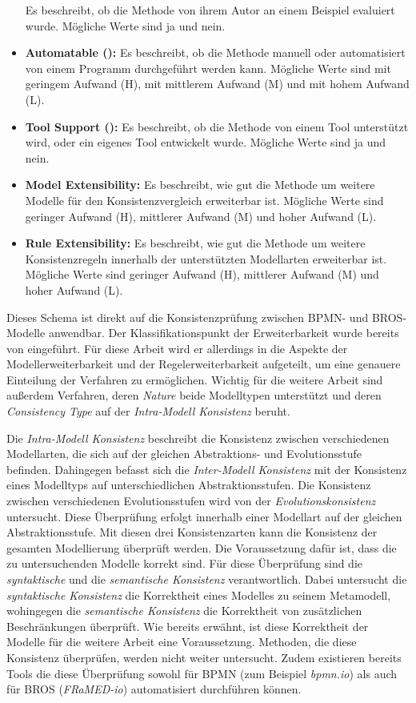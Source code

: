 \begin{itemize}
    Es beschreibt, ob die Methode von ihrem Autor an einem Beispiel evaluiert wurde.
    Mögliche Werte sind ja und nein. 
    \item \textbf{Automatable (\cite{Usman2008}):}
    Es beschreibt, ob die Methode manuell oder automatisiert von einem Programm durchgeführt werden kann.
    Mögliche Werte sind mit geringem Aufwand (H), mit mittlerem Aufwand (M) und mit hohem Aufwand (L).
    \item \textbf{Tool Support (\cite{Usman2008}):}
    Es beschreibt, ob die Methode von einem Tool unterstützt wird, oder ein eigenes Tool entwickelt wurde.
    Mögliche Werte sind ja und nein.
    \item \textbf{Model Extensibility:}
    Es beschreibt, wie gut die Methode um weitere Modelle für den Konsistenzvergleich erweiterbar ist.
    Mögliche Werte sind geringer Aufwand (H), mittlerer Aufwand (M) und hoher Aufwand (L).
    \item \textbf{Rule Extensibility:}
    Es beschreibt, wie gut die Methode um weitere Konsistenzregeln innerhalb der unterstützten Modellarten erweiterbar ist.
    Mögliche Werte sind geringer Aufwand (H), mittlerer Aufwand (M) und hoher Aufwand (L).
\end{itemize}


Dieses Schema ist direkt auf die Konsistenzprüfung zwischen BPMN- und BROS-Modelle anwendbar.
Der Klassifikationspunkt der Erweiterbarkeit wurde bereits von \cite{Lucas2009} eingeführt.
Für diese Arbeit wird er allerdings in die Aspekte der Modellerweiterbarkeit und der Regelerweiterbarkeit aufgeteilt, um eine genauere Einteilung der Verfahren zu ermöglichen.
Wichtig für die weitere Arbeit sind außerdem Verfahren, deren \emph{Nature} beide Modelltypen unterstützt und deren \emph{Consistency Type} auf der \emph{Intra-Modell Konsistenz} beruht.

Die \emph{Intra-Modell Konsistenz} beschreibt die Konsistenz zwischen verschiedenen Modellarten, die sich auf der gleichen Abstraktions- und Evolutionsstufe befinden.
Dahingegen befasst sich die \emph{Inter-Modell Konsistenz} mit der Konsistenz eines Modelltyps auf unterschiedlichen Abstraktionsstufen.
Die Konsistenz zwischen verschiedenen Evolutionsstufen wird von der \emph{Evolutionskonsistenz} untersucht.
Diese Überprüfung erfolgt innerhalb einer Modellart auf der gleichen Abstraktionsstufe.
Mit diesen drei Konsistenzarten kann die Konsistenz der gesamten Modellierung überprüft werden.
Die Voraussetzung dafür ist, dass die zu untersuchenden Modelle korrekt sind.
Für diese Überprüfung sind die \emph{syntaktische} und die \emph{semantische Konsistenz} verantwortlich.
Dabei untersucht die \emph{syntaktische Konsistenz} die Korrektheit eines Modelles zu seinem Metamodell, wohingegen die \emph{semantische Konsistenz} die Korrektheit von zusätzlichen Beschränkungen überprüft.
Wie bereits erwähnt, ist diese Korrektheit der Modelle für die weitere Arbeit eine Voraussetzung.
Methoden, die diese Konsistenz überprüfen, werden nicht weiter untersucht.
Zudem existieren bereits Tools die diese Überprüfung sowohl für BPMN (zum Beispiel \emph{bpmn.io}) als auch für BROS (\emph{FRaMED-io}) automatisiert durchführen können.

